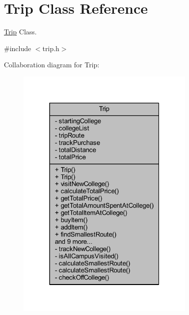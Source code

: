 \hypertarget{class_trip}{}\section{Trip Class Reference}
\label{class_trip}


\hyperlink{class_trip}{Trip} Class.  




{\ttfamily \#include $<$trip.\+h$>$}



Collaboration diagram for Trip\+:
\nopagebreak
\begin{figure}[H]
\begin{center}
\leavevmode
\includegraphics[width=247pt]{class_trip__coll__graph}
\end{center}
\end{figure}
